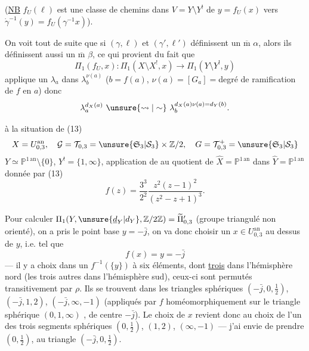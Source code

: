 (\uline{NB} $f_U(\ell)$ est une classe de chemins dans $V=Y\setminus Y^{!}$ de $y=f_U(x)$ vers $\dot\gamma^{-1}(y)=f_U(\gamma^{-1}x)$).

On voit tout de suite que si $(\gamma,\ell)$ et $(\gamma',\ell')$ définissent un $\overline{\mathrm m}$ $\alpha$, alors ils définissent aussi un $\overline{\mathrm m}$ $\beta$, ce qui provient du fait que
\[
\Pi_1(f_U,x):\Pi_1(X\setminus X^{!},x)\longrightarrow\Pi_1(Y\setminus Y^{!},y)
\]
applique un $\lambda_a$ dans \inserted{$\unsure{\rightsquigarrow}$} $\lambda_b^{\nu(a)}$
($b=f(a)$, $\nu(a)=[G_a]={}$degré de ramification de $f$ en $a$) donc
\[
\lambda_a^{d_X(a)}\ \unsure{\rightsquigarrow|\sim}\ \lambda_b^{d_X(a)\nu(a)=d_Y(b)}.
\]

 à la situation de (13)
\[
X=U_{0,3}^{\mathrm{an}},\quad
\mathcal G=\mathcal T_{0,3}=\unsure{\mathfrak S_3|\mathcal S_3}\times\mathbb Z/2,\quad
G=\mathcal T_{0,3}^{+}=\unsure{\mathfrak S_3|\mathcal S_3}
\]
$Y\simeq\mathbb P^{1\,\mathrm{an}}\setminus\{0\}$, $Y^{!}=\{1,\infty\}$,  application de  au quotient de $\widehat X=\mathbb P^{1\,\mathrm{an}}$ dans $\widehat Y=\mathbb P^{1\,\mathrm{an}}$ donnée par (13)
\[
f(z)=\frac{3^3}{2^2}\frac{z^2(z-1)^2}{(z^2-z+1)^3}.
\]


Pour calculer $\Pi_1(Y,\unsure{\underline d_Y|d_Y},\mathbb Z/2\mathbb Z)=\widetilde\Pi'_{0,3}$ (groupe  triangulé non orienté), on a pris le point base $y=-\bar j$, on va donc choisir un $x\in U_{0,3}^{\mathrm{an}}$ au dessus de $y$, i.e. tel que
\[
f(x)=y=-\bar j
\]
--- il y a   choix dans un  $f^{-1}(\{y\})$ à six éléments, dont \uline{trois} dans l'hémisphère nord (les trois autres dans l'hémisphère sud), ceux-ci sont permutés transitivement par $\rho$.
Ils se trouvent  dans les triangles sphériques $(-\bar j,0,\frac12)$, $(-\bar j,1,2)$, $(-\bar j,\infty,-1)$ (appliqués par $f$ homéomorphiquement sur le triangle sphérique $(0,1,\infty)$ ,  de centre $-\bar j$). Le choix de $x$ revient donc au choix de l'un des trois  segments sphériques $(0,\frac12)$, $(1,2)$, $(\infty,-1)$ --- j'ai envie de prendre $(0,\frac12)$,  au triangle $(-\bar j,0,\frac12)$.

